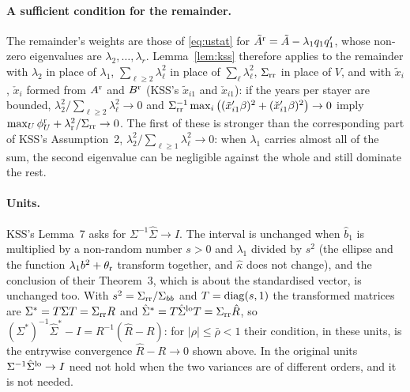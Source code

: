 \paragraph{A sufficient condition for the remainder.} The remainder's weights are those of \eqref{eq:ustat} for
$\tilde A^{\rm r}=\tilde A-\lambda_1q_1q_1'$, whose non-zero eigenvalues are $\lambda_2,\dots,\lambda_r$. Lemma~\ref{lem:kss}
therefore applies to the remainder with $\lambda_2$ in place of $\lambda_1$, $\sum_{\ell\ge2}\lambda_\ell^2$ in place of
$\sum_\ell\lambda_\ell^2$, $\Sigma_{\rm rr}$ in place of $V$, and with $\tilde x_i$, $\check x_i$ formed from $A^{\rm r}$ and
$B^{\rm r}$ (KSS's $\tilde x_{i1}$ and $\check x_{i1}$): if the years per stayer are bounded,
$\lambda_2^2/\sum_{\ell\ge2}\lambda_\ell^2\to0$ and
$\Sigma_{\rm rr}^{-1}\max_i\big((\tilde x_{i1}'\beta)^2+(\check x_{i1}'\beta)^2\big)\to0$ imply
$\max_U\phi^{\rm r}_U+\lambda_{\rm r}^2/\Sigma_{\rm rr}\to0$. The first of these is stronger than the corresponding part of
KSS's Assumption~2, $\lambda_2^2/\sum_{\ell\ge1}\lambda_\ell^2\to0$: when $\lambda_1$ carries almost all of the sum, the
second eigenvalue can be negligible against the whole and still dominate the rest.

\paragraph{Units.} KSS's Lemma~7 asks for $\Sigma^{-1}\hat\Sigma\to I$. The interval is unchanged when $\hat b_1$ is
multiplied by a non-random number $s>0$ and $\lambda_1$ divided by $s^2$ (the ellipse and the function
$\lambda_1b^2+\theta_{\rm r}$ transform together, and $\hat\kappa$ does not change), and the conclusion of their
Theorem~3, which is about the standardised vector, is unchanged too. With $s^2=\Sigma_{\rm rr}/\Sigma_{bb}$ and
$T=\operatorname{diag}(s,1)$ the transformed matrices are $\Sigma^*=T\Sigma T=\Sigma_{\rm rr}R$ and
$\hat\Sigma^*=T\hat\Sigma^{\rm lo}T=\Sigma_{\rm rr}\hat R$, so $(\Sigma^*)^{-1}\hat\Sigma^*-I=R^{-1}(\hat R-R)$: for
$|\rho|\le\bar\rho<1$ their condition, in these units, is the entrywise convergence $\hat R-R\to0$ shown above.
In the original units $\Sigma^{-1}\hat\Sigma^{\rm lo}\to I$ need not hold when the two variances are of different
orders, and it is not needed.

